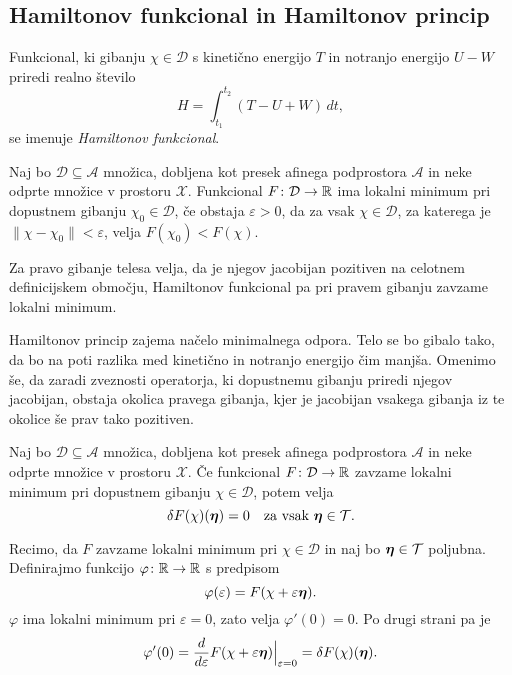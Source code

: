 \subsection{Hamiltonov funkcional in Hamiltonov princip}


\begin{definicija}
	Funkcional, ki gibanju $\chi\in \mathcal{D}$ s kinetično energijo $T$ in notranjo
	energijo $U-W$ priredi realno število
	\[
		H=\int_{t_1}^{t_2}(T-U+W)\,dt,
	\]
	se imenuje \emph{Hamiltonov funkcional}.
\end{definicija}

\begin{definicija}
	Naj bo $\mathcal{D}\subseteq\mathcal{A}$ množica, dobljena kot presek afinega podprostora $\mathcal{A}$ in
	neke odprte množice v prostoru $\mathcal{X}$.
	Funkcional $F\colon \mathcal{D}\to\mathbb R$ ima lokalni minimum pri dopustnem gibanju
	$\chi_{0}\in \mathcal{D}$, če obstaja $\varepsilon >0$,
	da za vsak $\chi\in \mathcal{D}$, za katerega je $\|\chi-\chi_{0}\|<\varepsilon$, velja $F(\chi_{0})<F(\chi)$.
\end{definicija}

\begin{hampri}
	Za pravo gibanje telesa velja, da je njegov jacobijan pozitiven na
	celotnem definicijskem območju, Hamiltonov funkcional pa pri pravem gibanju
	zavzame lokalni minimum.
\end{hampri}

Hamiltonov princip zajema načelo minimalnega odpora. Telo se bo gibalo tako, da
bo na poti razlika med kinetično in notranjo energijo čim manjša. Omenimo še, da zaradi zveznosti operatorja,
ki dopustnemu gibanju priredi njegov jacobijan, obstaja okolica pravega gibanja,
kjer je jacobijan vsakega gibanja iz te okolice še prav tako pozitiven.

\begin{trditev}
	Naj bo $\mathcal{D}\subseteq\mathcal{A}$ množica, dobljena kot presek afinega podprostora $\mathcal{A}$ in
	neke odprte množice v prostoru $\mathcal{X}$.
	Če funkcional $F\colon \mathcal{D}\to\mathbb R$ zavzame lokalni minimum pri dopustnem gibanju $\chi\in\mathcal{D}$, potem velja
	\[ \delta F(\chi)(\vek{\eta})=0\quad\textrm{za vsak}\ \vek{\eta}\in\mathcal{T}. \]
\end{trditev}

\proof
	Recimo, da $F$ zavzame lokalni minimum pri $\chi\in\mathcal{D}$ in naj bo $\boldsymbol \eta\in\mathcal{T}$ poljubna.
	Definirajmo funkcijo $\varphi\colon\mathbb R\to\mathbb R$ s predpisom
	\[ \varphi(\varepsilon)=F(\chi+\varepsilon\boldsymbol \eta). \]
	$\varphi$ ima lokalni minimum pri $\varepsilon=0$, zato velja $\varphi'(0)=0.$
	Po drugi strani pa je
	\[
		\varphi'(0)=\frac{d}{d\varepsilon}F(\chi+\varepsilon\boldsymbol \eta)\Big|_{\varepsilon=0}=
		\delta F(\chi)(\boldsymbol \eta).
	\]
\endproof

